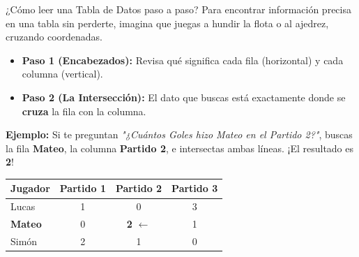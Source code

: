 \documentclass[12pt,letterpaper]{article}
\begin{document}
	\begin{truco}{¿Cómo leer una Tabla de Datos paso a paso?}
		Para encontrar información precisa en una tabla sin perderte, imagina que juegas a hundir la flota o al ajedrez, cruzando coordenadas.
		\begin{itemize}[itemsep=2pt, leftmargin=*]
			\item \textbf{Paso 1 (Encabezados):} Revisa qué significa cada fila (horizontal) y cada columna (vertical).
			\item \textbf{Paso 2 (La Intersección):} El dato que buscas está exactamente donde se \textbf{cruza} la fila con la columna.
		\end{itemize}
		\textbf{Ejemplo:} Si te preguntan \textit{"¿Cuántos Goles hizo Mateo en el Partido 2?"}, buscas la fila \textbf{Mateo}, la columna \textbf{Partido 2}, e intersectas ambas líneas. ¡El resultado es \textbf{2}!
		
		\begin{center}
			\small
			\renewcommand{\arraystretch}{1.2}
			\begin{tabular}{|l|c|c|c|}
				\hline
				\rowcolor{valorange!20} \textbf{Jugador} & \textbf{Partido 1} & \textbf{\textcolor{valred}{Partido 2}} & \textbf{Partido 3} \\ \hline
				Lucas & 1 & 0 & 3 \\ \hline
				\rowcolor{vallightred!40} \textbf{\textcolor{valred}{Mateo}} & 0 & \textbf{\textcolor{valred}{2}} $\leftarrow$ & 1 \\ \hline
				Simón & 2 & 1 & 0 \\ \hline
			\end{tabular}
		\end{center}
	\end{truco}
	
\end{document}
